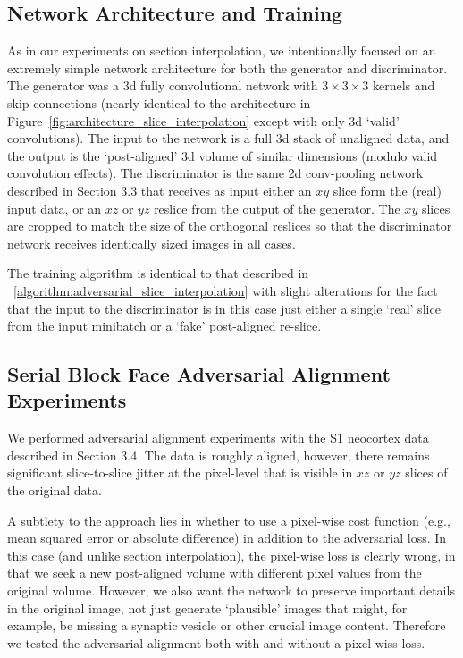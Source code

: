 \documentclass{article} %
\begin{document}
\subsection{Network Architecture and Training}
As in our experiments on section interpolation, we intentionally focused on an extremely simple network architecture for both the generator and discriminator. The generator was a 3d fully convolutional network with $3\times3\times3$ kernels and skip connections (nearly identical to the architecture in Figure~\ref{fig:architecture_slice_interpolation} except with only 3d `valid' convolutions). The input to the network is a full 3d stack of unaligned data, and the output is the `post-aligned' 3d volume of similar dimensions (modulo valid convolution effects). The discriminator is the same 2d conv-pooling network described in Section 3.3 that receives as input either an $xy$ slice form the (real) input data, or an $xz$ or $yz$ reslice from the output of the generator. The $xy$ slices are cropped to match the size of the orthogonal reslices so that the discriminator network receives identically sized images in all cases. 

The training algorithm is identical to that described in ~\ref{algorithm:adversarial_slice_interpolation} with slight alterations for the fact that the input to the discriminator is in this case just either a single `real' slice from the input minibatch or a `fake' post-aligned re-slice. 


\subsection{Serial Block Face Adversarial Alignment Experiments}
We performed adversarial alignment experiments with the S1 neocortex data described in Section 3.4. The data is roughly aligned, however, there remains significant slice-to-slice jitter at the pixel-level that is visible in $xz$ or $yz$ slices of the original data.

A subtlety to the approach lies in whether to use a pixel-wise cost function (e.g., mean squared error or absolute difference) in addition to the adversarial loss. In this case (and unlike section interpolation), the pixel-wise loss is clearly wrong, in that we seek a new post-aligned volume with different pixel values from the original volume. However, we also want the network to preserve important details in the original image, not just generate `plausible' images that might, for example, be missing a synaptic vesicle or other crucial image content. Therefore we tested the adversarial alignment both with and without a pixel-wiss loss.
\end{document}
